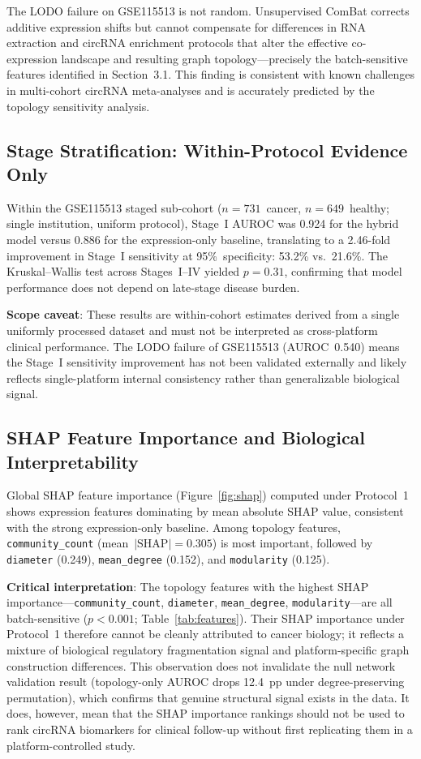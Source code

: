 \documentclass[12pt]{article}
\begin{document}
The LODO failure on GSE115513 is not random. Unsupervised ComBat
corrects additive expression shifts but cannot compensate for
differences in RNA extraction and circRNA enrichment protocols that
alter the effective co-expression landscape and resulting graph
topology---precisely the batch-sensitive features identified in
Section~3.1. This finding is consistent with known challenges in
multi-cohort circRNA meta-analyses and is accurately predicted by the
topology sensitivity analysis.

\subsection{Stage Stratification: Within-Protocol Evidence Only}

Within the GSE115513 staged sub-cohort ($n=731$~cancer,
$n=649$~healthy; single institution, uniform protocol), Stage~I AUROC
was 0.924 for the hybrid model versus 0.886 for the expression-only
baseline, translating to a 2.46-fold improvement in Stage~I
sensitivity at 95\%~specificity: 53.2\% vs.\ 21.6\%. The
Kruskal--Wallis test across Stages~I--IV yielded $p=0.31$, confirming
that model performance does not depend on late-stage disease burden.

\textbf{Scope caveat}: These results are within-cohort estimates
derived from a single uniformly processed dataset and must not be
interpreted as cross-platform clinical performance. The LODO failure
of GSE115513 (AUROC~0.540) means the Stage~I sensitivity improvement
has not been validated externally and likely reflects single-platform
internal consistency rather than generalizable biological signal.

\subsection{SHAP Feature Importance and Biological Interpretability}

Global SHAP feature importance (Figure~\ref{fig:shap}) computed under
Protocol~1 shows expression features dominating by mean absolute SHAP
value, consistent with the strong expression-only baseline. Among
topology features, \texttt{community\_count}
(mean~$|\text{SHAP}|=0.305$) is most important, followed by
\texttt{diameter} (0.249), \texttt{mean\_degree} (0.152), and
\texttt{modularity} (0.125).

\textbf{Critical interpretation}: The topology features with the
highest SHAP importance---\texttt{community\_count},
\texttt{diameter}, \texttt{mean\_degree}, \texttt{modularity}---are
all batch-sensitive ($p < 0.001$; Table~\ref{tab:features}). Their
SHAP importance under Protocol~1 therefore cannot be cleanly
attributed to cancer biology; it reflects a mixture of biological
regulatory fragmentation signal and platform-specific graph
construction differences. This observation does not invalidate the
null network validation result (topology-only AUROC drops 12.4~pp
under degree-preserving permutation), which confirms that genuine
structural signal exists in the data. It does, however, mean that the
SHAP importance rankings should not be used to rank circRNA biomarkers
for clinical follow-up without first replicating them in a
platform-controlled study.
\end{document}
